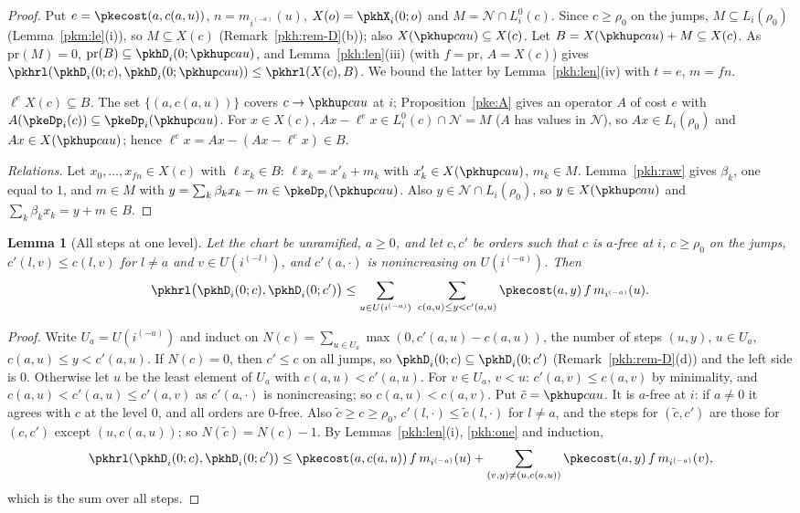 \documentclass[10pt]{amsart}
\newtheorem{lemma}[theorem]{Lemma}
\theoremstyle{definition}
\theoremstyle{remark}
\begin{document}
\begin{proof}
Put $e=\pkecost(a,c(a,u))$, $n=m_{i^{(-a)}}(u)$, $X(o)=\pkhX_i(0;o)$ and $M=\mathcal N\cap L^0_i(c)$. Since
$c\ge\rho_0$ on the jumps, $M\subseteq L_i(\rho_0)$ (Lemma~\ref{pkm:le}(i)), so $M\subseteq X(c)$
(Remark~\ref{pkh:rem-D}(b)); also $X(\pkhup cau)\subseteq X(c)$. Let $B=X(\pkhup cau)+M\subseteq X(c)$. As
$\mathrm{pr}(M)=0$, $\mathrm{pr}(B)\subseteq\pkhD_i(0;\pkhup cau)$, and Lemma~\ref{pkh:len}(iii) (with $f=\mathrm{pr}$,
$A=X(c)$) gives $\pkhrl(\pkhD_i(0;c),\pkhD_i(0;\pkhup cau))\le\pkhrl(X(c),B)$. We bound the latter by
Lemma~\ref{pkh:len}(iv) with $t=e$, $m=fn$.

\emph{$\ell^eX(c)\subseteq B$.} The set $\{(a,c(a,u))\}$ covers $c\to\pkhup cau$ at $i$; Proposition~\ref{pke:A}
gives an operator $A$ of cost $e$ with $A(\pkeDp_i(c))\subseteq\pkeDp_i(\pkhup cau)$. For $x\in X(c)$, $Ax-\ell^e
x\in L^0_i(c)\cap\mathcal N=M$ ($A$ has values in $\mathcal N$), so $Ax\in L_i(\rho_0)$ and $Ax\in X(\pkhup
cau)$; hence $\ell^ex=Ax-(Ax-\ell^ex)\in B$.

\emph{Relations.} Let $x_0,\dots,x_{fn}\in X(c)$ with $\ell x_k\in B$: $\ell x_k=x'_k+m_k$ with $x'_k\in
X(\pkhup cau)$, $m_k\in M$. Lemma~\ref{pkh:raw} gives $\beta_k$, one equal to $1$, and $m\in M$ with
$y=\sum_k\beta_kx_k-m\in\pkeDp_i(\pkhup cau)$. Also $y\in\mathcal N\cap L_i(\rho_0)$, so $y\in X(\pkhup cau)$
and $\sum_k\beta_kx_k=y+m\in B$.
\end{proof}

\begin{lemma}[All steps at one level]\label{pkh:level}
Let the chart be unramified, $a\ge0$, and let $c,c'$ be orders such that $c$ is $a$-free at $i$, $c\ge\rho_0$ on
the jumps, $c'(l,v)\le c(l,v)$ for $l\ne a$ and $v\in U(i^{(-l)})$, and $c'(a,\cdot)$ is nonincreasing on
$U(i^{(-a)})$. Then
\[
\pkhrl\bigl(\pkhD_i(0;c),\pkhD_i(0;c')\bigr)\le\sum_{u\in U(i^{(-a)})}\ \sum_{c(a,u)\le y<c'(a,u)}
\pkecost(a,y)\,f\,m_{i^{(-a)}}(u).
\]
\end{lemma}

\begin{proof}
Write $U_a=U(i^{(-a)})$ and induct on $N(c)=\sum_{u\in U_a}\max(0,c'(a,u)-c(a,u))$, the number of steps
$(u,y)$, $u\in U_a$, $c(a,u)\le y<c'(a,u)$. If $N(c)=0$, then $c'\le c$ on all jumps, so $\pkhD_i(0;c)\subseteq
\pkhD_i(0;c')$ (Remark~\ref{pkh:rem-D}(d)) and the left side is $0$. Otherwise let $u$ be the least element of
$U_a$ with $c(a,u)<c'(a,u)$. For $v\in U_a$, $v<u$: $c'(a,v)\le c(a,v)$ by minimality, and
$c(a,u)<c'(a,u)\le c'(a,v)$ as $c'(a,\cdot)$ is nonincreasing; so $c(a,u)<c(a,v)$. Put $\tilde c=\pkhup cau$. It
is $a$-free at $i$: if $a\ne0$ it agrees with $c$ at the level $0$, and all orders are $0$-free. Also
$\tilde c\ge c\ge\rho_0$, $c'(l,\cdot)\le\tilde c(l,\cdot)$ for $l\ne a$, and the steps for $(\tilde c,c')$ are
those for $(c,c')$ except $(u,c(a,u))$; so $N(\tilde c)=N(c)-1$. By Lemmas~\ref{pkh:len}(i), \ref{pkh:one} and
induction,
\[
\pkhrl(\pkhD_i(0;c),\pkhD_i(0;c'))\le\pkecost(a,c(a,u))\,f\,m_{i^{(-a)}}(u)+\sum_{(v,y)\ne(u,c(a,u))}
\pkecost(a,y)\,f\,m_{i^{(-a)}}(v),
\]
which is the sum over all steps.
\end{proof}
\end{document}
